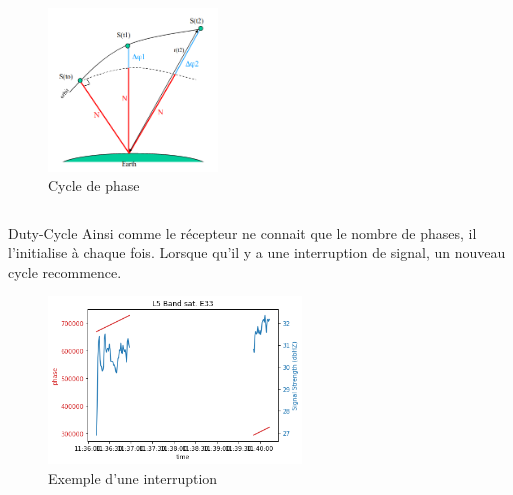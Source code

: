 \documentclass[xcolor=dvipsnames,envcountsect]{beamer}
\begin{document}
\begin{frame}
\begin{columns}
\begin{column}{0.5\textwidth}
			\begin{figure}
				\centering
				\includegraphics[width=0.4\textwidth]{./Figures/phase.png}
				\caption {Cycle de phase \cite{ens}}
			\end{figure}
		\end{column}
	\end{columns}
\end{frame}
\begin{frame}{Duty-Cycle}
	Ainsi comme le récepteur ne connait que le nombre de phases, il l'initialise à chaque fois.
	\newline
	Lorsque qu'il y a une interruption de signal, un nouveau cycle recommence.
	\begin{figure}
		\centering
		\includegraphics[width=0.6\textwidth]{./Figures/duty_cycle_eg.png}
		\caption{Exemple d'une interruption}
	\end{figure}
\end{frame}
\end{document}
